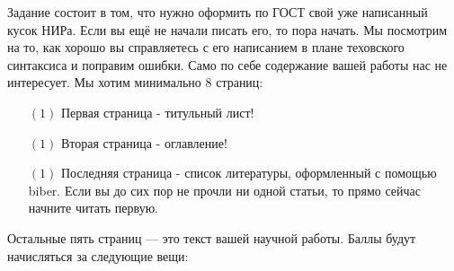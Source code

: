 \documentclass[12pt, a4paper, oneside]{article}
\begin{document}
Задание состоит в том, что нужно оформить по ГОСТ свой уже написанный кусок НИРа.  Если вы ещё не начали писать его, то пора начать. Мы посмотрим на то, как хорошо вы справляетесь с его написанием в плане теховского синтаксиса и поправим ошибки. Само по себе содержание вашей работы нас не интересует. Мы хотим минимально 8 страниц: 

\begin{itemize} 
\item[$(1)$] Первая страница - титульный лист!

\item[$(1)$]  Вторая страница - оглавление!

\item[$(1)$]  Последняя страница - список литературы, оформленный с помощью biber. Если вы до сих пор не прочли ни одной статьи, то прямо сейчас начните читать первую.
\end{itemize} 

Остальные пять страниц — это текст вашей научной работы. Баллы будут начисляться за следующие вещи:
\end{document}
